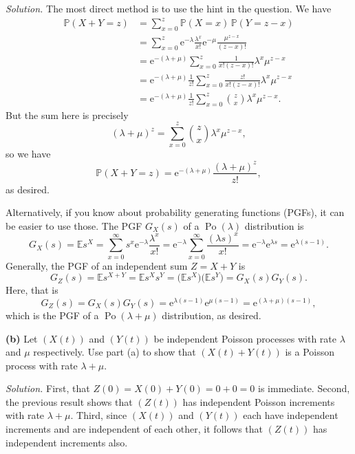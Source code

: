 \documentclass[
  a4paper,
]{article}
\theoremstyle{definition}
\theoremstyle{definition}
\theoremstyle{definition}
\theoremstyle{remark}
\begin{document}
\begin{myanswers}
\emph{Solution.} The most direct method is to use the hint in the question. We have
\begin{align*}
\mathbb P(X+Y = z) &= \sum_{x=0}^z \mathbb P(X = x) \, \mathbb P(Y = z-x) \\
  &= \sum_{x=0}^z \mathrm{e}^{-\lambda} \frac{\lambda^x}{x!} \mathrm{e}^{-\mu} \frac{\mu^{z-x}}{(z-x)!} \\
  &= \mathrm{e}^{-(\lambda + \mu)} \sum_{x=0}^z \frac{1}{x!(z-x)!} \lambda^x \mu^{z-x} \\
  &= \mathrm{e}^{-(\lambda + \mu)} \frac{1}{z!} \sum_{x=0}^z \frac{z!}{x!(z-x)!} \lambda^x \mu^{z-x} \\
  &= \mathrm{e}^{-(\lambda + \mu)} \frac{1}{z!} \sum_{x=0}^z \binom{z}{x} \lambda^x \mu^{z-x} .
\end{align*}
But the sum here is precisely
\[ (\lambda + \mu)^z = \sum_{x=0}^z \binom{z}{x} \lambda^x \mu^{z-x} ,  \]
so we have
\[ \mathbb P(X+Y = z) = \mathrm{e}^{-(\lambda + \mu)} \frac{(\lambda+\mu)^z}{z!}    , \]
as desired.

Alternatively, if you know about probability generating functions (PGFs), it can be easier to use those. The PGF \(G_X(s)\) of a \(\operatorname{Po}(\lambda)\) distribution is
\[ G_X(s) =  \mathbb Es^X = \sum_{x=0}^\infty s^x \mathrm{e}^{-\lambda} \frac{\lambda^x}{x!} 
=   \mathrm{e}^{-\lambda}\sum_{x=0}^\infty \frac{(\lambda s)^x}{x!} = \mathrm{e}^{-\lambda} \mathrm{e}^{\lambda s} = \mathrm{e}^{\lambda (s-1)} . \]
Generally, the PGF of an independent sum \(Z = X+Y\) is
\[ G_Z(s) = \mathbb E s^{X+Y} = \mathbb E s^{X}s^{Y} = \big(\mathbb Es^X\big)\big( \mathbb Es^Y\big) = G_X(s) G_Y(s) .\]
Here, that is
\[ G_Z(s) = G_X(s) G_Y(s) = \mathrm{e}^{\lambda (s-1)}\mathrm{e}^{\mu(s-1)} = \mathrm{e}^{(\lambda+\mu) (s-1)} , \]
which is the PGF of a \(\operatorname{Po}(\lambda + \mu)\) distribution, as desired.

\end{myanswers}

\textbf{(b)} Let \((X(t))\) and \((Y(t))\) be independent Poisson processes with rate \(\lambda\) and \(\mu\) respectively. Use part (a) to show that \((X(t) + Y(t))\) is a Poisson process with rate \(\lambda + \mu\).

\begin{myanswers}
\emph{Solution.}
First, that \(Z(0) = X(0) + Y(0) = 0 + 0 = 0\) is immediate. Second, the previous result shows that \((Z(t))\) has independent Poisson increments with rate \(\lambda + \mu\). Third, since \((X(t))\) and \((Y(t))\) each have independent increments and are independent of each other, it follows that \((Z(t))\) has independent increments also.

\end{myanswers}
\end{document}
